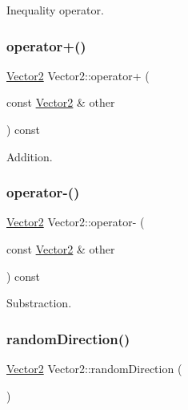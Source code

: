 Inequality operator. 

\mbox{\label{struct_vector2_a53bdaa4ea8e1504f8a78ac78e6f151bf}} 
\subsubsection{\texorpdfstring{operator+()}{operator+()}}
{\footnotesize\ttfamily \mbox{\hyperlink{struct_vector2}{Vector2}} Vector2\+::operator+ (\begin{DoxyParamCaption}\item[{const \mbox{\hyperlink{struct_vector2}{Vector2}} \&}]{other }\end{DoxyParamCaption}) const}



Addition. 

\mbox{\label{struct_vector2_a9f6650ee1529209532c14fc0e4e97a6a}} 
\subsubsection{\texorpdfstring{operator-\/()}{operator-()}}
{\footnotesize\ttfamily \mbox{\hyperlink{struct_vector2}{Vector2}} Vector2\+::operator-\/ (\begin{DoxyParamCaption}\item[{const \mbox{\hyperlink{struct_vector2}{Vector2}} \&}]{other }\end{DoxyParamCaption}) const}



Substraction. 

\mbox{\label{struct_vector2_a4ae4f36c515bda9939cfe36e58b25f45}} 
\subsubsection{\texorpdfstring{random\+Direction()}{randomDirection()}}
{\footnotesize\ttfamily \mbox{\hyperlink{struct_vector2}{Vector2}} Vector2\+::random\+Direction (\begin{DoxyParamCaption}{ }\end{DoxyParamCaption})\hspace{0.3cm}{\ttfamily [static]}}

